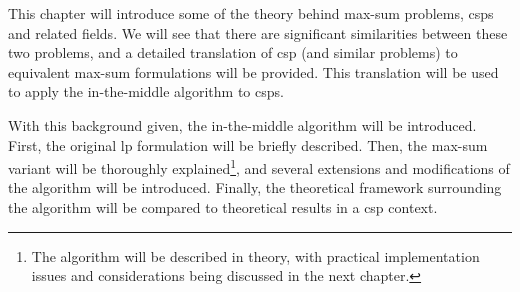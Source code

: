 This chapter will introduce some of the theory behind max-sum problems, \glspl{csp} and related fields.
We will see that there are significant similarities between these two problems, and a detailed translation of \gls{csp} (and similar problems) to equivalent max-sum formulations will be provided.
This translation will be used to apply the in-the-middle algorithm to \glspl{csp}.

With this background given, the in-the-middle algorithm will be introduced. First, the original \gls{lp} formulation will be briefly described.
Then, the max-sum variant will be thoroughly explained\footnote{The algorithm will be described in theory, with practical implementation issues and considerations being discussed in the next chapter.}, and several extensions and modifications of the algorithm will be introduced.
Finally, the theoretical framework surrounding the algorithm will be compared to theoretical results in a \gls{csp} context.

